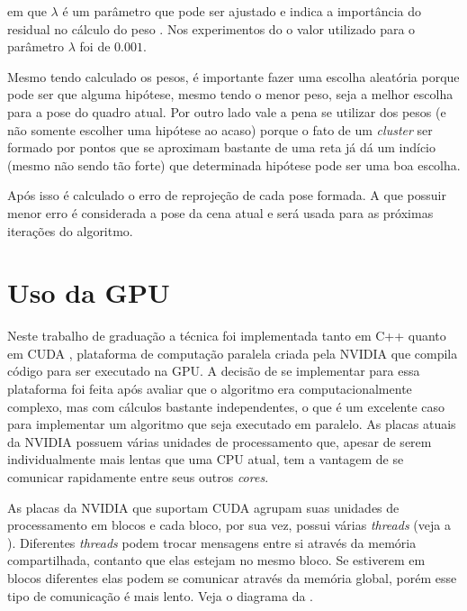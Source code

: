 \noindent
em que $\lambda$ é um parâmetro que pode ser ajustado e indica a importância do residual no cálculo do peso \cite{celine}. Nos experimentos do  o valor utilizado para o parâmetro $\lambda$ foi de $0.001$.

Mesmo tendo calculado os pesos, é importante fazer uma escolha aleatória porque pode ser que alguma hipótese, mesmo tendo o menor peso, seja a melhor escolha para a pose do quadro atual. Por outro lado vale a pena se utilizar dos pesos (e não somente escolher uma hipótese ao acaso) porque o fato de um \emph{cluster} ser formado por pontos que se aproximam bastante de uma reta já dá um indício (mesmo não sendo tão forte) que determinada hipótese pode ser uma boa escolha.



Após isso é calculado o erro de reprojeção de cada pose formada. A que possuir menor erro é considerada a pose da cena atual e será usada para as próximas iterações do algoritmo.

\section{Uso da GPU}

Neste trabalho de graduação a técnica foi implementada tanto em C++ quanto em CUDA \cite{cuda}, plataforma de computação paralela criada pela NVIDIA que compila código para ser executado na GPU. A decisão de se implementar para essa plataforma foi feita após avaliar que o algoritmo era computacionalmente complexo, mas com cálculos bastante independentes, o que é um excelente caso para implementar um algoritmo que seja executado em paralelo. As placas atuais da NVIDIA possuem várias unidades de processamento que, apesar de serem individualmente mais lentas que uma CPU atual, tem a vantagem de se comunicar rapidamente entre seus outros \emph{cores}.

As placas da NVIDIA que suportam CUDA agrupam suas unidades de processamento em blocos e cada bloco, por sua vez, possui várias \emph{threads} (veja a ). Diferentes \emph{threads} podem trocar mensagens entre si através da memória compartilhada, contanto que elas estejam no mesmo bloco. Se estiverem em blocos diferentes elas podem se comunicar através da memória global, porém esse tipo de comunicação é mais lento. Veja o diagrama da .

